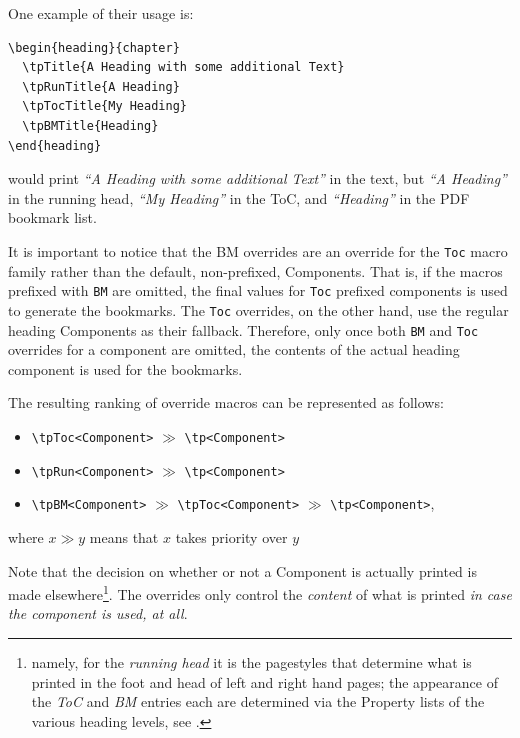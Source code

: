 One example of their usage is:
\begin{lstlisting}[style=tex]
\begin{heading}{chapter}
  \tpTitle{A Heading with some additional Text}
  \tpRunTitle{A Heading}
  \tpTocTitle{My Heading}
  \tpBMTitle{Heading}
\end{heading}
\end{lstlisting}
would print \textit{“A Heading with some additional Text”} in the
text, but \textit{“A Heading”} in the running head, \textit{“My
  Heading”} in the ToC, and \textit{“Heading”} in the PDF bookmark
list.

It is important to notice that the BM overrides are an override for
the \lstinline{Toc} macro family rather than the default,
non-prefixed, Components. That is, if the macros prefixed with
\lstinline{BM} are omitted, the final values for \lstinline{Toc}
prefixed components is used to generate the bookmarks. The
\lstinline{Toc} overrides, on the other hand, use the regular heading
Components as their fallback. Therefore, only once both \lstinline{BM}
and \lstinline{Toc} overrides for a component are omitted, the
contents of the actual heading component is used for the bookmarks.

The resulting ranking of override macros can be represented as
follows:
\begin{itemize}
\item \lstinline{\tpToc<Component>} $\gg$ \lstinline{\tp<Component>}
\item \lstinline{\tpRun<Component>} $\gg$ \lstinline{\tp<Component>}
\item \lstinline{\tpBM<Component>} $\gg$ \lstinline{\tpToc<Component>} $\gg$ \lstinline{\tp<Component>},
\end{itemize}
where $x\gg y$ means that $x$ takes priority over $y$

Note that the decision on whether or not a Component is actually
printed is made elsewhere\footnote{namely, for the
  \textit{running head} it is the pagestyles that determine what is
  printed in the foot and head of left and right hand pages; the
  appearance of the \textit{ToC} and \textit{BM} entries each are
  determined via the Property lists of the various heading levels, see
  .}. The overrides only control the
\textit{content} of what is printed \textit{in case the component is
  used, at all}.

